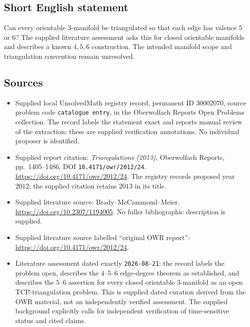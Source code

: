 \documentclass[11pt]{article}
\begin{document}
\subsection{Short English statement}
Can every orientable \(3\)-manifold be triangulated so that each edge has valence \(5\) or \(6\)? The supplied literature assessment asks this for closed orientable manifolds and describes a known \(4,5,6\) construction. The intended manifold scope and triangulation convention remain unresolved.
\subsection{Sources}
\begin{itemize}
\item Supplied local UnsolvedMath registry record, permanent ID \(30002070\), source problem code \texttt{catalogue entry}, in the Oberwolfach Reports Open Problems collection. The record labels the statement exact and reports manual review of the extraction; these are supplied verification annotations. No individual proposer is identified.
\item Supplied report citation: \emph{Triangulations (2013)}, Oberwolfach Reports, pp.\ 1405--1486, DOI \texttt{10.4171/owr/2012/24}. \url{https://doi.org/10.4171/owr/2012/24}. The registry records proposed year \(2012\); the supplied citation retains \(2013\) in its title.
\item Supplied literature source: Brady--McCammond--Meier. \url{https://doi.org/10.2307/1194005}. No fuller bibliographic description is supplied.
\item Supplied literature source labelled ``original OWR report'': \url{https://doi.org/10.4171/owr/2012/24}.
\item Literature assessment dated exactly \texttt{2026-08-21}: the record labels the problem open, describes the \(4\)--\(5\)--\(6\) edge-degree theorem as established, and describes the \(5\)--\(6\) assertion for every closed orientable \(3\)-manifold as an open TCP-triangulation problem. This is supplied dated curation derived from the OWR material, not an independently verified assessment. The supplied background explicitly calls for independent verification of time-sensitive status and cited claims.
\end{itemize}
\end{document}
